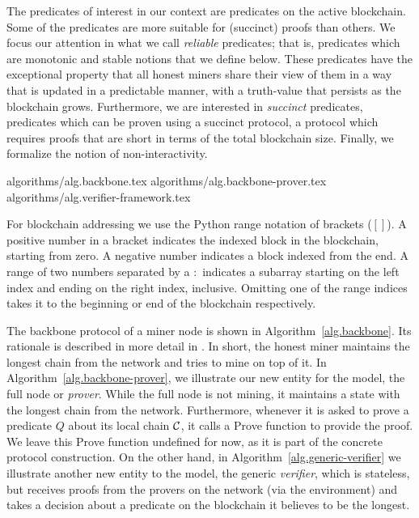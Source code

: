 The predicates of interest in our context are predicates on the active blockchain. 
Some of the predicates are more suitable for (succinct) proofs than others. We focus
our attention in what we call \textit{reliable} predicates; that is,
predicates which are monotonic and stable notions that we define below.  
These predicates have the
exceptional property that all honest miners share their view of them in a way
that is updated in a predictable manner, with a truth-value that persists as the
blockchain grows.  Furthermore, we are interested in \textit{succinct}
predicates, predicates which can be proven using a succinct protocol, a
protocol which requires proofs that are short in terms of the total blockchain
size. Finally, we formalize the notion of non-interactivity.


{algorithms/alg.backbone.tex}
{algorithms/alg.backbone-prover.tex}
{algorithms/alg.verifier-framework.tex}

For blockchain addressing we use the Python range notation of brackets ($[]$).
A positive number in a bracket indicates the indexed block in the blockchain,
starting from zero. A negative number indicates a block indexed from the end. A
range of two numbers separated by a $:$ indicates a subarray starting on the
left index and ending on the right index, inclusive. Omitting one of the range
indices takes it to the beginning or end of the blockchain respectively.

The backbone protocol of a miner node is shown in Algorithm~\ref{alg.backbone}.
Its rationale is described in more detail in \cite{backbone}. In short, the
honest miner maintains the longest chain from the network and tries to mine on
top of it. In Algorithm~\ref{alg.backbone-prover}, we illustrate our new entity
for the model, the full node or \textit{prover}. While the full node is not
mining, it maintains a state with the longest chain from the network.
Furthermore, whenever it is asked to prove a predicate $Q$ about its local
chain $\mathcal{C}$, it calls a Prove function to provide the proof. We leave this
Prove function undefined for now, as it is part of the concrete protocol
construction. On the other hand, in Algorithm~\ref{alg.generic-verifier} we
illustrate another new entity to the model, the generic \textit{verifier},
which is stateless, but receives proofs from the provers on the network (via
the environment) and takes a decision about a predicate on the blockchain it
believes to be the longest.

